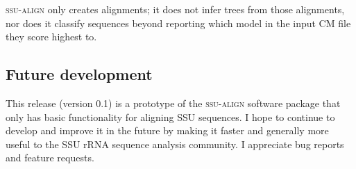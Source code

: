 \textsc{ssu-align} only creates alignments; it does not infer trees
from those alignments, nor does it classify sequences beyond reporting
which model in the input CM file they score highest to.

\subsection{Future development}

This release (version 0.1) is a prototype of the \textsc{ssu-align}
software package that only has basic functionality for aligning SSU
sequences. I hope to continue to develop and improve it in the future
by making it faster and generally more useful to the SSU rRNA sequence
analysis community. I appreciate bug reports and feature requests.
